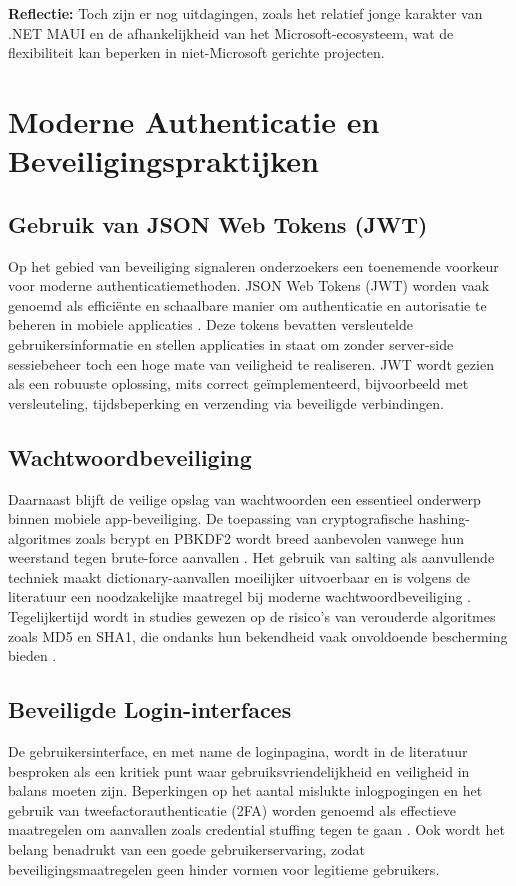 \textbf{Reflectie:} Toch zijn er nog uitdagingen, zoals het relatief jonge karakter van .NET MAUI en de afhankelijkheid van het Microsoft-ecosysteem, wat de flexibiliteit kan beperken in niet-Microsoft gerichte projecten.

\section{Moderne Authenticatie en Beveiligingspraktijken}

\subsection{Gebruik van JSON Web Tokens (JWT)}
Op het gebied van beveiliging signaleren onderzoekers een toenemende voorkeur voor moderne authenticatiemethoden. JSON Web Tokens (JWT) worden vaak genoemd als efficiënte en schaalbare manier om authenticatie en autorisatie te beheren in mobiele applicaties \autocite{Gao2023}. Deze tokens bevatten versleutelde gebruikersinformatie en stellen applicaties in staat om zonder server-side sessiebeheer toch een hoge mate van veiligheid te realiseren. JWT wordt gezien als een robuuste oplossing, mits correct geïmplementeerd, bijvoorbeeld met versleuteling, tijdsbeperking en verzending via beveiligde verbindingen.

\subsection{Wachtwoordbeveiliging}
Daarnaast blijft de veilige opslag van wachtwoorden een essentieel onderwerp binnen mobiele app-beveiliging. De toepassing van cryptografische hashing-algoritmes zoals bcrypt en PBKDF2 wordt breed aanbevolen vanwege hun weerstand tegen brute-force aanvallen \autocite{Gupta2022}. Het gebruik van salting als aanvullende techniek maakt dictionary-aanvallen moeilijker uitvoerbaar en is volgens de literatuur een noodzakelijke maatregel bij moderne wachtwoordbeveiliging \autocite{Arias2025}. Tegelijkertijd wordt in studies gewezen op de risico’s van verouderde algoritmes zoals MD5 en SHA1, die ondanks hun bekendheid vaak onvoldoende bescherming bieden \autocite{ReesCarter2024}.

\subsection{Beveiligde Login-interfaces}
De gebruikersinterface, en met name de loginpagina, wordt in de literatuur besproken als een kritiek punt waar gebruiksvriendelijkheid en veiligheid in balans moeten zijn. Beperkingen op het aantal mislukte inlogpogingen en het gebruik van tweefactorauthenticatie (2FA) worden genoemd als effectieve maatregelen om aanvallen zoals credential stuffing tegen te gaan \autocite{Chinnasamy2025, Jurisons2024}. Ook wordt het belang benadrukt van een goede gebruikerservaring, zodat beveiligingsmaatregelen geen hinder vormen voor legitieme gebruikers.

